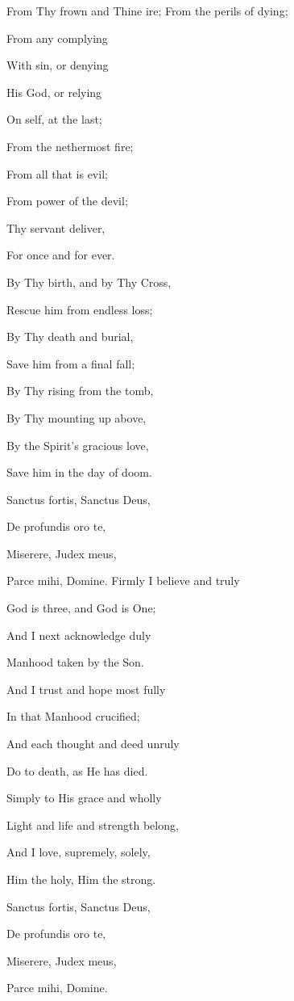 From Thy frown and Thine ire; From the perils of dying;

From any complying

With sin, or denying

His God, or relying

On self, at the last;

From the nethermost fire;

From all that is evil;

From power of the devil;

Thy servant deliver,

For once and for ever.

By Thy birth, and by Thy Cross,

Rescue him from endless loss;

By Thy death and burial,

Save him from a final fall;

By Thy rising from the tomb,

By Thy mounting up above,

By the Spirit's gracious love,

Save him in the day of doom.


Sanctus fortis, Sanctus Deus,

De profundis oro te,

Miserere, Judex meus,

Parce mihi, Domine. Firmly I believe and truly

God is three, and God is One;

And I next acknowledge duly

Manhood taken by the Son.

And I trust and hope most fully

In that Manhood crucified;

And each thought and deed unruly

Do to death, as He has died.

Simply to His grace and wholly

Light and life and strength belong,

And I love, supremely, solely,

Him the holy, Him the strong.

Sanctus fortis, Sanctus Deus,

De profundis oro te,

Miserere, Judex meus,

Parce mihi, Domine.

